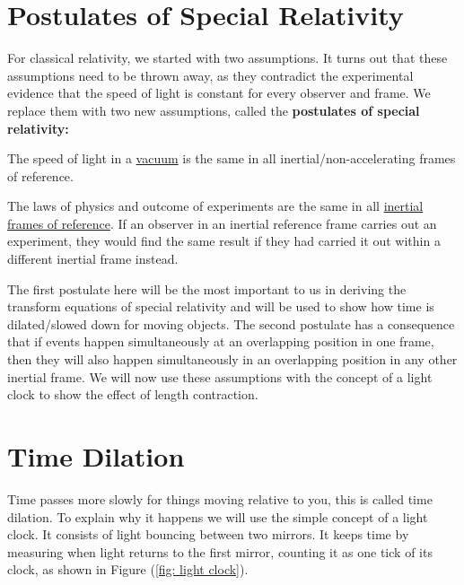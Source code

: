 \section{Postulates of Special Relativity} \label{sect: Postulates of Special Relativity}

For classical relativity, we started with two assumptions. It turns out that these assumptions need to be thrown away, as they contradict the experimental evidence that the speed of light is constant for every observer and frame. We replace them with two new assumptions, called the \textbf{postulates of special relativity:}

\begin{mainpoints}
	\item The speed of light in a \hyperlink{def-vacuum}{vacuum} is the same in all inertial/non-accelerating frames of reference.
	\item The laws of physics and outcome of experiments are the same in all \hyperlink{def-Inertial-reference-frame}{inertial frames of reference}. If an observer in an inertial reference frame carries out an experiment, they would find the same result if they had carried it out within a different inertial frame instead.
\end{mainpoints}

The first postulate here will be the most important to us in deriving the transform equations of special relativity and will be used to show how time is dilated/slowed down for moving objects. The second postulate has a consequence that if events happen simultaneously at an overlapping position in one frame, then they will also happen simultaneously in an overlapping position in any other inertial frame.
We will now use these assumptions with the concept of a light clock to show the effect of length contraction.

\section{Time Dilation} \label{sect: Time Dilation}

Time passes more slowly for things moving relative to you, this is called time dilation.
To explain why it happens we will use the simple concept of a light clock.
It consists of light bouncing between two mirrors.
It keeps time by measuring when light returns to the first mirror, counting it as one tick of its clock, as shown in Figure (\ref{fig: light clock}).

